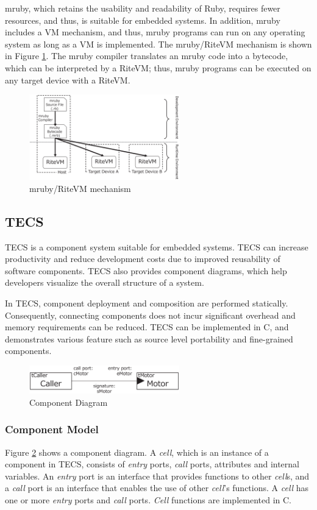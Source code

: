 \documentclass[S,R,E]{article/compsoft}
\begin{document}
mruby, which retains the usability and readability of Ruby, requires fewer resources, and thus, is suitable for embedded systems.
In addition, mruby includes a VM mechanism, and thus, mruby programs can run on any operating system as long as a VM is implemented.
The mruby/RiteVM mechanism is shown in Figure \ref{fig:mruby}.
The mruby compiler translates an mruby code into a bytecode, which can be interpreted by a RiteVM; thus, mruby programs can be executed on any target device with a RiteVM.
\begin{figure}[t]
    \centering
    \includegraphics[width=6.5cm,clip]{figure/mruby.eps}
    \caption{mruby/RiteVM mechanism}
    \label{fig:mruby}
\end{figure}

\subsection{TECS}
\label{sec:TECS}
TECS is a component system suitable for embedded systems.
TECS can increase productivity and reduce development costs due to improved reusability of software components.
TECS also provides component diagrams, which help developers visualize the overall structure of a system.

In TECS, component deployment and composition are performed statically.
Consequently, connecting components does not incur significant overhead and memory requirements can be reduced.
TECS can be implemented in C, and demonstrates various feature such as source level portability and fine-grained components.

\begin{figure}[t]
    \centering
    \includegraphics[width=6.5cm,clip]{figure/component_diagram.eps}
    \caption{Component Diagram}
    \label{fig:component}
\end{figure}

\subsubsection{Component Model}
Figure \ref{fig:component} shows a component diagram.
A {\it cell}, which is an instance of a component in TECS, consists of {\it entry} ports, {\it call} ports, attributes and internal variables.
An {\it entry} port is an interface that provides functions to other {\it cell}s, and a {\it call} port is an interface that enables the use of other {\it cell}'s functions.
A {\it cell} has one or more {\it entry} ports and {\it call} ports.
{\it Cell} functions are implemented in C.
\end{document}
